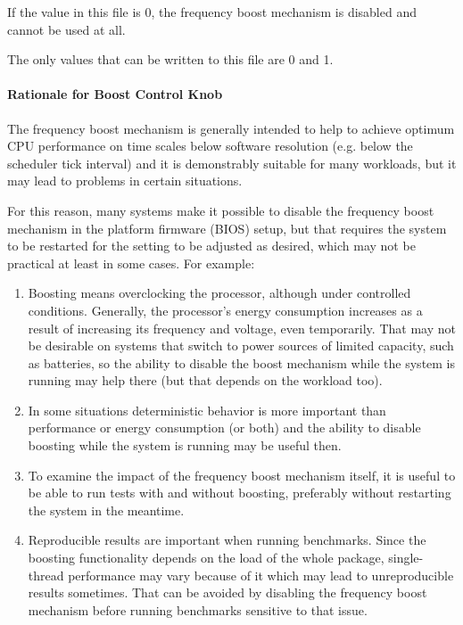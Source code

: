 \documentclass[a4paper,8pt,english]{sphinxmanual}
\begin{document}
If the value in this file is 0, the frequency boost mechanism is disabled and
cannot be used at all.

The only values that can be written to this file are 0 and 1.


\paragraph{Rationale for Boost Control Knob}
\label{admin-guide/pm/cpufreq:rationale-for-boost-control-knob}
The frequency boost mechanism is generally intended to help to achieve optimum
CPU performance on time scales below software resolution (e.g. below the
scheduler tick interval) and it is demonstrably suitable for many workloads, but
it may lead to problems in certain situations.

For this reason, many systems make it possible to disable the frequency boost
mechanism in the platform firmware (BIOS) setup, but that requires the system to
be restarted for the setting to be adjusted as desired, which may not be
practical at least in some cases.  For example:
\begin{enumerate}
\item {} 
Boosting means overclocking the processor, although under controlled
conditions.  Generally, the processor's energy consumption increases
as a result of increasing its frequency and voltage, even temporarily.
That may not be desirable on systems that switch to power sources of
limited capacity, such as batteries, so the ability to disable the boost
mechanism while the system is running may help there (but that depends on
the workload too).

\item {} 
In some situations deterministic behavior is more important than
performance or energy consumption (or both) and the ability to disable
boosting while the system is running may be useful then.

\item {} 
To examine the impact of the frequency boost mechanism itself, it is useful
to be able to run tests with and without boosting, preferably without
restarting the system in the meantime.

\item {} 
Reproducible results are important when running benchmarks.  Since
the boosting functionality depends on the load of the whole package,
single-thread performance may vary because of it which may lead to
unreproducible results sometimes.  That can be avoided by disabling the
frequency boost mechanism before running benchmarks sensitive to that
issue.

\end{enumerate}
\end{document}
